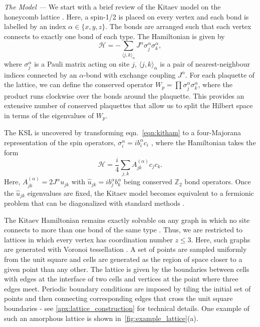 \documentclass[%
 reprint,
superscriptaddress,
 amsmath,amssymb,
aps,
]{revtex4-2}
\begin{document}
{\it The Model ---} 
We start with a brief review of the Kitaev model on the honeycomb lattice \cite{kitaevAnyonsExactlySolved2006}. Here, a spin-1/2 is placed on every vertex and each bond is labelled by an index $\alpha \in \{ x, y, z\}$. The bonds are arranged such that each vertex connects to exactly one bond of each type. The Hamiltonian is given by
\begin{equation}
    \label{eqn:kitham}
    \mathcal{H} =  - \sum_{\langle j,k\rangle_\alpha} J^{\alpha}\sigma_j^{\alpha}\sigma_k^{\alpha},
\end{equation}
where $\sigma^\alpha_j$ is a Pauli matrix acting on site $j$, \(\langle j,k\rangle_\alpha\) is a pair of nearest-neighbour indices connected by an $\alpha$-bond with exchange coupling $J^\alpha$. For each plaquette of the lattice, we can define the conserved operator $ W_p = \prod \sigma_j^{\alpha}\sigma_k^{\alpha}$, where the product runs clockwise over the bonds around the plaquette. This provides an extensive number of conserved plaquettes that allow us to split the Hilbert space in terms of the eigenvalues of $W_p$.\par
The KSL is uncovered by transforming eqn.~\ref{eqn:kitham} to a four-Majorana representation of the spin operators, $\sigma_i^\alpha = i b_i^\alpha c_i$ \cite{kitaevAnyonsExactlySolved2006}, where the Hamiltonian takes the form
\begin{equation}\label{eqn:majorana_hamiltonian}
    \mathcal{H} = \frac{i}{4}\sum_{j,k}A_{jk}^{(\alpha)}c_jc_k.
\end{equation}
Here, $A_{jk}^{(\alpha)}=2J^{\alpha}u_{jk}$ with $\hat u_{jk} = ib_j^{\alpha}b_k^{\alpha}$ being conserved $\mathbb Z_2$ bond operators. Once the $\hat u_{jk}$ eigenvalues are fixed, the Kitaev model becomes equivalent to a fermionic problem that can be diagonalized with standard methods \cite{BlaizotRipka1986}. \par
The Kitaev Hamiltonian remains exactly solvable on any graph in which no site connects to more than one bond of the same type \cite{Nussinov2009}. Thus, we are  restricted to lattices in which every vertex has coordination number $z \leq 3$. Here, such graphs are generated with Voronoi tessellation \cite{florescu_designer_2009}. A set of points are sampled uniformly from the unit square and cells are generated as the region of space closer to a given point than any other. The lattice is given by the boundaries between cells with edges at the interface of two cells and vertices at the point where three edges meet. Periodic boundary conditions are imposed by tiling the initial set of points and then connecting corresponding edges that cross the unit square boundaries - see \cref{apx:lattice_construction} for technical details. One example of such an amorphous lattice is shown in~\cref{fig:example_lattice}(a).\par
\end{document}
